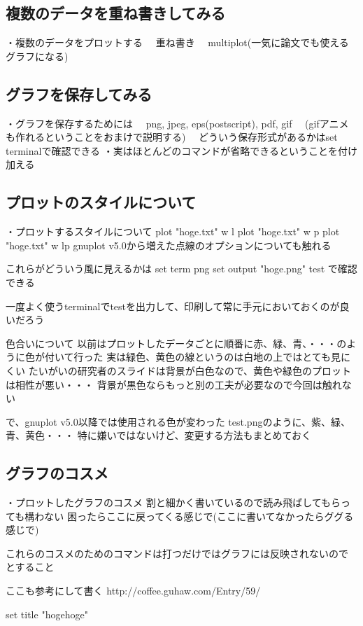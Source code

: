 \documentclass[11pt]{jsarticle}
\begin{document}
\subsection{複数のデータを重ね書きしてみる}
・複数のデータをプロットする
　重ね書き
　multiplot(一気に論文でも使えるグラフになる)

\subsection{グラフを保存してみる}
・グラフを保存するためには
　png, jpeg, eps(postscript), pdf, gif
　(gifアニメも作れるということをおまけで説明する)
　どういう保存形式があるかはset terminalで確認できる
・実はほとんどのコマンドが省略できるということを付け加える

\subsection{プロットのスタイルについて}
・プロットするスタイルについて
plot "hoge.txt" w l
plot "hoge.txt" w p
plot "hoge.txt" w lp
gnuplot v5.0から増えた点線のオプションについても触れる

これらがどういう風に見えるかは
set term png
set output "hoge.png"
test
で確認できる

一度よく使うterminalでtestを出力して、印刷して常に手元においておくのが良いだろう

色合いについて
以前はプロットしたデータごとに順番に赤、緑、青、・・・のように色が付いて行った
実は緑色、黄色の線というのは白地の上ではとても見にくい
たいがいの研究者のスライドは背景が白色なので、黄色や緑色のプロットは相性が悪い・・・
背景が黒色ならもっと別の工夫が必要なので今回は触れない

で、gnuplot v5.0以降では使用される色が変わった
test.pngのように、紫、緑、青、黄色・・・
特に嫌いではないけど、変更する方法もまとめておく


\subsection{グラフのコスメ}
・プロットしたグラフのコスメ
割と細かく書いているので読み飛ばしてもらっても構わない
困ったらここに戻ってくる感じで(ここに書いてなかったらググる感じで)

これらのコスメのためのコマンドは打つだけではグラフには反映されないので
とすること

ここも参考にして書く
http://coffee.guhaw.com/Entry/59/

set title "hogehoge"
\end{document}
